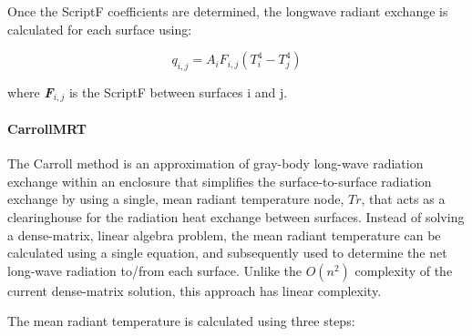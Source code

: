 Once the ScriptF coefficients are determined, the longwave radiant exchange is calculated for each surface using:

\begin{equation}
{q_{i,j}} = {A_i}{F_{i,j}}\left( {T_i^4 - T_j^4} \right)
\end{equation}

where \textbf{\emph{F}}\(_{i,j}\) is the ScriptF between surfaces i and j.

\paragraph{CarrollMRT}

The Carroll method is an approximation of gray-body long-wave radiation exchange within an enclosure that simplifies the surface-to-surface radiation exchange by using a single, mean radiant temperature node, $Tr$, that acts as a clearinghouse for the radiation heat exchange between surfaces. Instead of solving a dense-matrix, linear algebra problem, the mean radiant temperature can be calculated using a single equation, and subsequently used to determine the net long-wave radiation to/from each surface. Unlike the $O(n^2)$ complexity of the current dense-matrix solution, this approach has linear complexity.

The mean radiant temperature is calculated using three steps:

